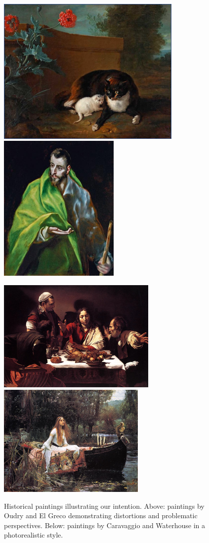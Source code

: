\begin{figure}[ht] \centering
\includegraphics[height=2.83in]{images/oudry.jpg}
\includegraphics[height=2.83in]{images/elgreco.jpg} \vspace{0.5mm}

\noindent \hspace{-0.06in}
\includegraphics[height=2.15in]{images/caravaggio.jpg}
\includegraphics[height=2.15in]{images/waterhouse.jpg}
\caption{Historical
paintings illustrating our intention. Above: paintings by Oudry and El Greco
demonstrating distortions and problematic perspectives. Below: paintings by Caravaggio and
Waterhouse in a photorealistic style.}
\label{fig:artists}
\end{figure}

